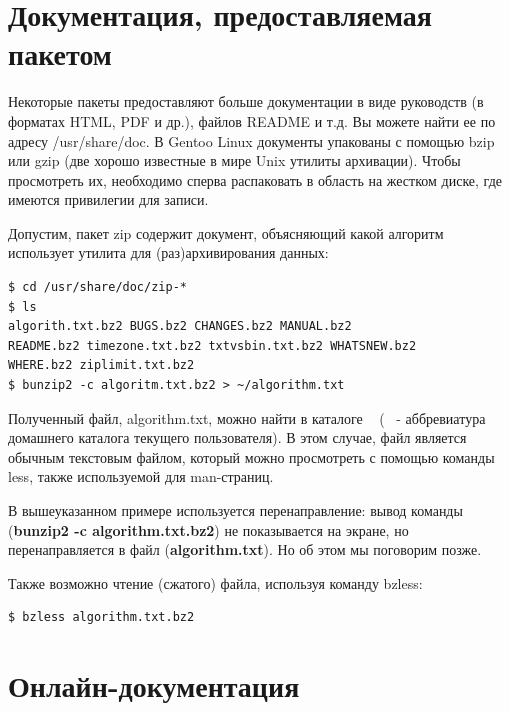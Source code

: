 \documentclass[10pt]{book}
\begin{document}
\section{Документация, предоставляемая пакетом}

Некоторые пакеты предоставляют больше документации в виде руководств (в форматах HTML, PDF и др.), файлов README и т.д. Вы можете найти ее по адресу /usr/share/doc. В Gentoo Linux документы упакованы с помощью bzip или gzip (две хорошо известные в мире Unix утилиты архивации). Чтобы  просмотреть их, необходимо сперва распаковать в область на жестком диске, где имеются привилегии для записи.

Допустим, пакет zip содержит документ, объясняющий какой алгоритм использует утилита для (раз)архивирования данных:

\vspace{3mm}
\begin{tcolorbox}
\begin{lstlisting}
$ cd /usr/share/doc/zip-*
$ ls
algorith.txt.bz2 BUGS.bz2 CHANGES.bz2 MANUAL.bz2
README.bz2 timezone.txt.bz2 txtvsbin.txt.bz2 WHATSNEW.bz2
WHERE.bz2 ziplimit.txt.bz2
$ bunzip2 -c algoritm.txt.bz2 > ~/algorithm.txt
\end{lstlisting}
\end{tcolorbox}

Полученный файл, algorithm.txt, можно найти в каталоге ~ (~ - аббревиатура домашнего каталога текущего пользователя). В этом случае, файл является обычным текстовым файлом, который можно просмотреть с помощью команды less, также используемой для man-страниц.

В вышеуказанном примере используется перенаправление: вывод команды  (\textbf{bunzip2 -c algorithm.txt.bz2}) не показывается на экране, но перенаправляется в файл (\textbf{algorithm.txt}). Но об этом мы поговорим позже.

Также возможно чтение (сжатого) файла, используя команду bzless:

\vspace{3mm}
\begin{tcolorbox}
\begin{lstlisting}
$ bzless algorithm.txt.bz2
\end{lstlisting}
\end{tcolorbox}

\section{Онлайн-документация}
\end{document}
